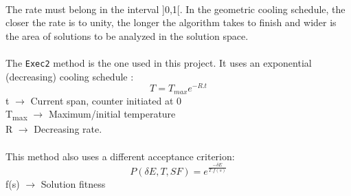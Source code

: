\\
The rate must belong in the interval ]0,1[. In the geometric cooling schedule, the closer the rate is to unity, the longer the algorithm takes to finish and wider is the area of solutions to be analyzed in the solution space.\\
\\
The \verb+Exec2+ method is the one used in this project. It uses an exponential (decreasing) cooling schedule \cite{CarvalhoLisbonNovember2004}:\\
\[T = T_{max}e^{-R.t} \]
t $\rightarrow$ Current span, counter initiated at 0\\
T\textsubscript{max} $\rightarrow$ Maximum/initial temperature\\
R $\rightarrow$ Decreasing rate.\\
\\
This method also uses a different acceptance criterion:\\
\[P(\delta E, T, SF) = e^{\frac{-\delta E}{T.f(s)}} \]
f(s) $\rightarrow$ Solution fitness\\
\\

